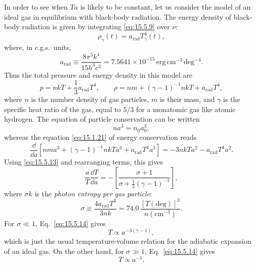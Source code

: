 In order to see when \(Ta\) is likely to be constant, let us consider the model
of an ideal gas in equilibrium with black-body radiation. The energy density of
black-body radiation is given by integrating \eqref{eq:15.5.9} over \(\nu\):
\[
  \rho_\gamma(t)=a_{\mathrm{rad}}T_\gamma^4(t),
\]
where, in c.g.s.\ units,
\[
  a_{\mathrm{rad}}\equiv\frac{8\pi^5k^4}{15h^3c^3}
  =7.5641\times10^{-15}\,
  \mathrm{erg\,cm^{-3}\,deg^{-4}}.
\]
Thus the total pressure and energy density in this model are
\[
  p=nkT+\frac13a_{\mathrm{rad}}T^4,
  \qquad
  \rho=nm+(\gamma-1)^{-1}nkT+a_{\mathrm{rad}}T^4,
\]
where \(n\) is the number density of gas particles, \(m\) is their mass, and
\(\gamma\) is the specific heat ratio of the gas, equal to \(5/3\) for a
monatomic gas like atomic hydrogen. The equation of particle conservation can
be written
\begin{equation}
  na^3=n_0a_0^3,
  \tag{15.5.13}\label{eq:15.5.13}
\end{equation}
whereas the equation \eqref{eq:15.1.21} of energy conservation reads
\[
  \frac{\dd}{\dd a}
  \left[
    nma^3+(\gamma-1)^{-1}nkTa^3+a_{\mathrm{rad}}T^4a^3
  \right]
  =
  -3nkTa^2-a_{\mathrm{rad}}T^4a^2.
\]
Using \eqref{eq:15.5.13} and rearranging terms, this gives
\begin{equation}
  \frac{a}{T}\frac{\dd T}{\dd a}
  =
  -\left[
    \frac{\sigma+1}
    {\sigma+\tfrac13(\gamma-1)^{-1}}
  \right],
  \tag{15.5.14}\label{eq:15.5.14}
\end{equation}
where \(\sigma k\) is the \emph{photon entropy per gas particle}:
\begin{equation}
  \sigma
  \equiv
  \frac{4a_{\mathrm{rad}}T^3}{3nk}
  =
  74.0\,
  \frac{[T(\mathrm{deg})]^3}{n(\mathrm{cm^{-3}})}.
  \tag{15.5.15}\label{eq:15.5.15}
\end{equation}
For \(\sigma\ll1\), Eq.~\eqref{eq:15.5.14} gives
\begin{equation}
  T\propto a^{-3(\gamma-1)},
  \tag{15.5.16}\label{eq:15.5.16}
\end{equation}
which is just the usual temperature-volume relation for the adiabatic expansion
of an ideal gas. On the other hand, for \(\sigma\gg1\),
Eq.~\eqref{eq:15.5.14} gives
\begin{equation}
  T\propto a^{-1}.
  \tag{15.5.17}\label{eq:15.5.17}
\end{equation}

